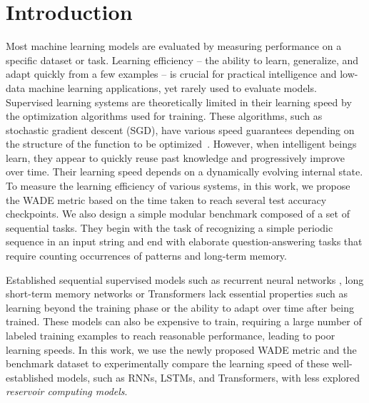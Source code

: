 \section{Introduction}
Most machine learning models are evaluated by measuring performance on a
specific dataset or task. Learning efficiency -- the ability to learn,
generalize, and adapt quickly from a few examples -- is crucial for practical
intelligence \parencite{kanazawaGeneralIntelligenceDomainspecific2004} and
low-data machine learning applications, yet rarely used to evaluate models.
Supervised learning systems are theoretically limited in their learning speed by
the optimization algorithms used for training. These algorithms, such as
stochastic gradient descent (SGD), have various speed guarantees depending on the
structure of the function to be
optimized~\parencite{bottouOptimizationMethodsLargescale2018}. However, when
intelligent beings learn, they appear to quickly reuse past knowledge and
progressively improve over time. Their learning speed depends on a dynamically
evolving internal state.
To measure the learning efficiency of various systems, in this work, we propose the \ac{WADE}
metric based on the time taken to reach several test accuracy checkpoints. We
also design a simple modular benchmark composed of a set of sequential tasks.
They begin with the task of recognizing a simple periodic sequence in an input
string and end with elaborate question-answering tasks that require counting
occurrences of patterns and long-term memory.

Established sequential supervised models such as recurrent neural networks
\parencite[RNNs; ][]{elmanFindingStructureTime1990}, long short-term memory
networks \parencite[LSTMs;][]{hochreiterLongShortTermMemory1997} or Transformers
\parencite{vaswaniAttentionAllYou2017} lack essential properties such as
learning beyond the training phase or the ability to adapt over time after being
trained. These models can also be expensive to train, requiring a large number
of labeled training examples to reach reasonable performance, leading to poor
learning speeds. In this work, we use the newly proposed \ac{WADE} metric and
the benchmark dataset to experimentally compare the learning speed of these
well-established models, such as RNNs, LSTMs, and Transformers, with less
explored {\em reservoir computing models}.

